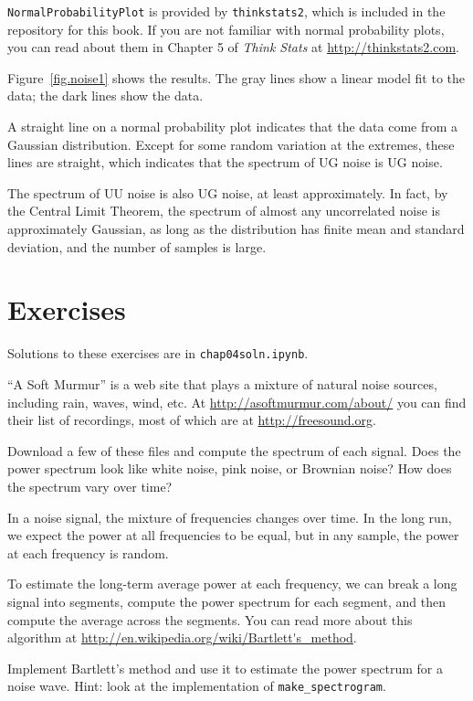 \documentclass[12pt]{book} \usepackage[width=5.5in,height=8.5in, hmarginratio=3:2,vmarginratio=1:1]{geometry}
\begin{document}
{\tt NormalProbabilityPlot} is provided by {\tt thinkstats2}, which is included in the repository for this book. If you are not familiar with normal probability plots, you can read about them in Chapter 5 of {\it Think Stats} at \url{http://thinkstats2.com}. 

Figure~\ref{fig.noise1} shows the results. The gray lines show a linear model fit to the data; the dark lines show the data. 

A straight line on a normal probability plot indicates that the data come from a Gaussian distribution. Except for some random variation at the extremes, these lines are straight, which indicates that the spectrum of UG noise is UG noise. 

The spectrum of UU noise is also UG noise, at least approximately. In fact, by the Central Limit Theorem, the spectrum of almost any uncorrelated noise is approximately Gaussian, as long as the distribution has finite mean and standard deviation, and the number of samples is large. 

\section{Exercises} 

Solutions to these exercises are in {\tt chap04soln.ipynb}. 

\begin{exercise} ``A Soft Murmur'' is a web site that plays a mixture of natural noise sources, including rain, waves, wind, etc. At \url{http://asoftmurmur.com/about/} you can find their list of recordings, most of which are at \url{http://freesound.org}. 

Download a few of these files and compute the spectrum of each signal. Does the power spectrum look like white noise, pink noise, or Brownian noise? How does the spectrum vary over time? \end{exercise} 

\begin{exercise} In a noise signal, the mixture of frequencies changes over time. In the long run, we expect the power at all frequencies to be equal, but in any sample, the power at each frequency is random. 

To estimate the long-term average power at each frequency, we can break a long signal into segments, compute the power spectrum for each segment, and then compute the average across the segments. You can read more about this algorithm at \url{http://en.wikipedia.org/wiki/Bartlett's_method}. 

Implement Bartlett's method and use it to estimate the power spectrum for a noise wave. Hint: look at the implementation of \verb"make_spectrogram". \end{exercise} 
\end{document}
